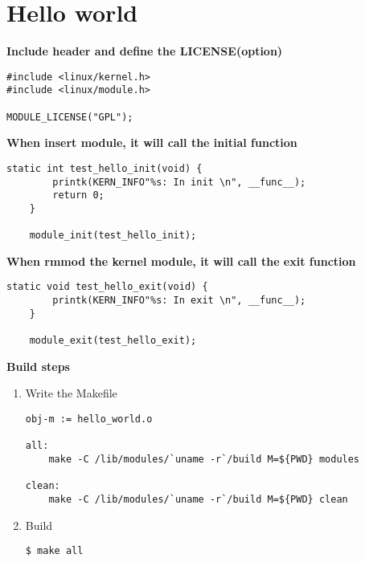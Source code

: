 \section{Hello world}

\text{}

\textbf{Include header and define the LICENSE(option)}
\begin{lstlisting}[style=CStyle]
#include <linux/kernel.h>
#include <linux/module.h>

MODULE_LICENSE("GPL");
\end{lstlisting}

\textbf{When insert module, it will call the initial function}
\begin{lstlisting}[style=CStyle]
    static int test_hello_init(void) {
        printk(KERN_INFO"%s: In init \n", __func__);
        return 0;
    }

    module_init(test_hello_init);
\end{lstlisting}

\textbf{When rmmod the kernel module, it will call the exit function}
\begin{lstlisting}[style=CStyle]
    static void test_hello_exit(void) {
        printk(KERN_INFO"%s: In exit \n", __func__);
    }

    module_exit(test_hello_exit);
\end{lstlisting}


\textbf{Build steps}
\begin{enumerate}
    \item Write the Makefile
\begin{lstlisting}[style=bashStyle]
obj-m := hello_world.o

all:
    make -C /lib/modules/`uname -r`/build M=${PWD} modules

clean:
    make -C /lib/modules/`uname -r`/build M=${PWD} clean
\end{lstlisting}
    \item Build
\begin{lstlisting}[style=bashStyle]
    $ make all
\end{lstlisting}
\end{enumerate}


